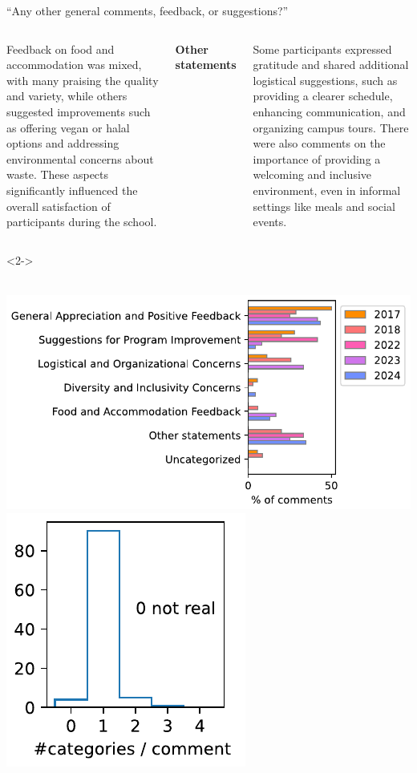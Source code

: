 \documentclass[aspectratio=169]{beamer}
\begin{document}
\begin{frame}{``Any other general comments, feedback, or suggestions?''}
\begin{columns}
\vspace{0.1 cm}
Feedback on food and accommodation was mixed, with many praising the quality and variety, while others suggested improvements such as offering vegan or halal options and addressing environmental concerns about waste. These aspects significantly influenced the overall satisfaction of participants during the school.

\vspace{0.2 cm}
{\bf\small Other statements}

\vspace{0.1 cm}
Some participants expressed gratitude and shared additional logistical suggestions, such as providing a clearer schedule, enhancing communication, and organizing campus tours. There were also comments on the importance of providing a welcoming and inclusive environment, even in informal settings like meals and social events.

\end{columns}

\begin{uncoverenv}<2->
\vspace{-5 cm}
\begin{tcolorbox}[colback=white, colframe=black]
\begin{minipage}{\linewidth}
\mbox{ } \hfill \includegraphics[height=4 cm]{PLOTS/general_feedback_categorization.pdf}\includegraphics[height=3 cm]{PLOTS/general_feedback_categorization_hist.pdf} \hfill \mbox{ }
\end{minipage}
\end{tcolorbox}
\end{uncoverenv}
\end{frame}
\end{document}
